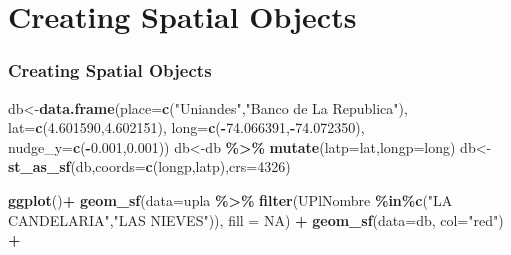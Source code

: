 \documentclass[
  shownotes,
  xcolor={svgnames},
  hyperref={colorlinks,citecolor=DarkBlue,linkcolor=DarkRed,urlcolor=DarkBlue}
  ]{beamer}
\newenvironment{Shaded}{\begin{snugshade}}{\end{snugshade}}
\newcommand{\DataTypeTok}[1]{\textcolor[rgb]{0.13,0.29,0.53}{#1}}
\newcommand{\DecValTok}[1]{\textcolor[rgb]{0.00,0.00,0.81}{#1}}
\newcommand{\FloatTok}[1]{\textcolor[rgb]{0.00,0.00,0.81}{#1}}
\newcommand{\KeywordTok}[1]{\textcolor[rgb]{0.13,0.29,0.53}{\textbf{#1}}}
\newcommand{\NormalTok}[1]{#1}
\newcommand{\OperatorTok}[1]{\textcolor[rgb]{0.81,0.36,0.00}{\textbf{#1}}}
\newcommand{\OtherTok}[1]{\textcolor[rgb]{0.56,0.35,0.01}{#1}}
\newcommand{\StringTok}[1]{\textcolor[rgb]{0.31,0.60,0.02}{#1}}
\begin{document}
\section{Creating Spatial Objects}
\begin{frame}[fragile]
\frametitle{Creating Spatial Objects}

\begin{scriptsize}
\begin{Shaded}
\begin{Highlighting}[]
\NormalTok{db\textless{}{-}}\KeywordTok{data.frame}\NormalTok{(}\DataTypeTok{place=}\KeywordTok{c}\NormalTok{(}\StringTok{"Uniandes"}\NormalTok{,}\StringTok{"Banco de La Republica"}\NormalTok{),}
		\DataTypeTok{lat=}\KeywordTok{c}\NormalTok{(}\FloatTok{4.601590}\NormalTok{,}\FloatTok{4.602151}\NormalTok{), }
		\DataTypeTok{long=}\KeywordTok{c}\NormalTok{(}\OperatorTok{{-}}\FloatTok{74.066391}\NormalTok{,}\OperatorTok{{-}}\FloatTok{74.072350}\NormalTok{), }
		\DataTypeTok{nudge\_y=}\KeywordTok{c}\NormalTok{(}\OperatorTok{{-}}\FloatTok{0.001}\NormalTok{,}\FloatTok{0.001}\NormalTok{))}
\NormalTok{db\textless{}{-}db }\OperatorTok{\%\textgreater{}\%}\StringTok{ }\KeywordTok{mutate}\NormalTok{(}\DataTypeTok{latp=}\NormalTok{lat,}\DataTypeTok{longp=}\NormalTok{long)}
\NormalTok{db\textless{}{-}}\KeywordTok{st\_as\_sf}\NormalTok{(db,}\DataTypeTok{coords=}\KeywordTok{c}\NormalTok{(}\StringTok{\textquotesingle{}longp\textquotesingle{}}\NormalTok{,}\StringTok{\textquotesingle{}latp\textquotesingle{}}\NormalTok{),}\DataTypeTok{crs=}\DecValTok{4326}\NormalTok{)}
\end{Highlighting}
\end{Shaded}
\end{scriptsize}
\begin{minipage}[t]{0.52\linewidth}
        \begin{tiny}
        \begin{Shaded}
\begin{Highlighting}[]
\KeywordTok{ggplot}\NormalTok{()}\OperatorTok{+}
\StringTok{  }\KeywordTok{geom\_sf}\NormalTok{(}\DataTypeTok{data=}\NormalTok{upla }
	\OperatorTok{\%\textgreater{}\%}\StringTok{ }\KeywordTok{filter}\NormalTok{(UPlNombre}
	\OperatorTok{\%in\%}\KeywordTok{c}\NormalTok{(}\StringTok{"LA CANDELARIA"}\NormalTok{,}\StringTok{"LAS NIEVES"}\NormalTok{)), }\DataTypeTok{fill =} \OtherTok{NA}\NormalTok{) }\OperatorTok{+}
\StringTok{  }\KeywordTok{geom\_sf}\NormalTok{(}\DataTypeTok{data=}\NormalTok{db, }\DataTypeTok{col=}\StringTok{"red"}\NormalTok{) }\OperatorTok{+}

\end{Highlighting}
\end{Shaded}
\end{tiny}
\end{minipage}
\end{frame}
\end{document}

